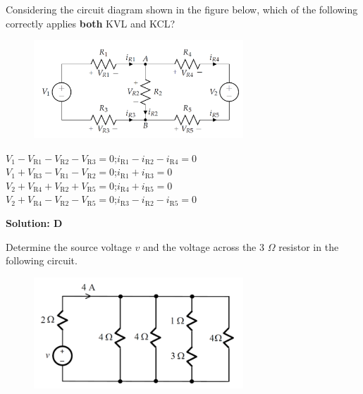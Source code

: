 \documentclass[a4paper, 12pt, addpoints]{exam}
\begin{document}
\begin{questions}
\question Considering the circuit diagram shown in the figure below, which of the following correctly applies \textbf{both} KVL and KCL?
\begin{figure}[h!]
    \centering
    \includegraphics[width=0.7\textwidth]{images/Q3.png}
\end{figure}

\begin{oneparchoices}
    \choice $V_1 - V_\text{R1} - V_\text{R2} - V_\text{R3} = 0$;\quad$i_\text{R1} - i_\text{R2} - i_\text{R4} = 0$ \\
    \choice $V_1 + V_\text{R3} - V_\text{R1} - V_\text{R2} = 0$;\quad$i_\text{R1} + i_\text{R3} = 0$ \\
    \choice $V_2 + V_\text{R4} + V_\text{R2} + V_\text{R5} = 0$;\quad$i_\text{R4} + i_\text{R5} = 0$ \\
    \choice $V_2 + V_\text{R4} - V_\text{R2} - V_\text{R5} = 0$;\quad$i_\text{R3} - i_\text{R2} - i_\text{R5} = 0$
\end{oneparchoices}

\begin{tcolorbox}
    \textbf{Solution: D}
\end{tcolorbox}

\question Determine the source voltage $v$ and the voltage across the 3 $\Omega$ resistor in the following circuit.
\begin{figure}[h!]
    \centering
    \includegraphics[width=0.7\textwidth]{images/Q4.png}
\end{figure}


\end{questions}
\end{document}
